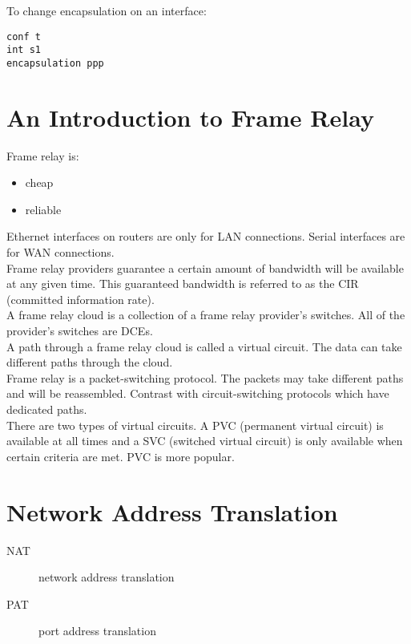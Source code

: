 \documentclass{article}
\begin{document}
To change encapsulation on an interface:

\begin{verbatim}
conf t
int s1
encapsulation ppp
\end{verbatim}

\section{An Introduction to Frame Relay}

Frame relay is:

\begin{itemize}
\item cheap
\item reliable
\end{itemize}

Ethernet interfaces on routers are only for LAN connections. Serial interfaces
are for WAN connections.\\

Frame relay providers guarantee a certain amount of bandwidth will be
available at any given time. This guaranteed bandwidth is referred to as
the CIR (committed information rate).\\

A frame relay cloud is a collection of a frame relay provider's switches.
All of the provider's switches are DCEs.\\

A path through a frame relay cloud is called a virtual circuit. The data
can take different paths through the cloud.\\

Frame relay is a packet-switching protocol. The packets may take different
paths and will be reassembled. Contrast with circuit-switching protocols
which have dedicated paths.\\

There are two types of virtual circuits. A PVC (permanent virtual circuit)
is available at all times and a SVC (switched virtual circuit) is only
available when certain criteria are met. PVC is more popular.

\section{Network Address Translation}

\begin{description}

\item[NAT]
network address translation  

\item[PAT]
port address translation

\end{description}
\end{document}
